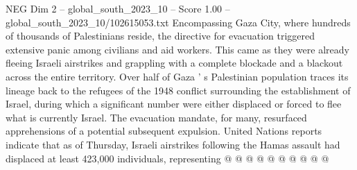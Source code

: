 \begin{textsample}{NEG Dim 2 – global\_south\_2023\_10 – Score 1.00 – global\_south\_2023\_10/102615053.txt}
Encompassing Gaza City, where hundreds of thousands of Palestinians reside, the directive for evacuation triggered extensive panic among civilians and aid workers.
This came as they were already fleeing Israeli airstrikes and grappling with a complete blockade and a blackout across the entire territory.
Over half of Gaza ' s Palestinian population traces its lineage back to the refugees of the 1948 conflict surrounding the establishment of Israel, during which a significant number were either displaced or forced to flee what is currently Israel.
The evacuation mandate, for many, resurfaced apprehensions of a potential subsequent expulsion.
United Nations reports indicate that as of Thursday, Israeli airstrikes following the Hamas assault had displaced at least 423,000 individuals, representing @ @ @ @ @ @ @ @ @ @

\end{textsample}
